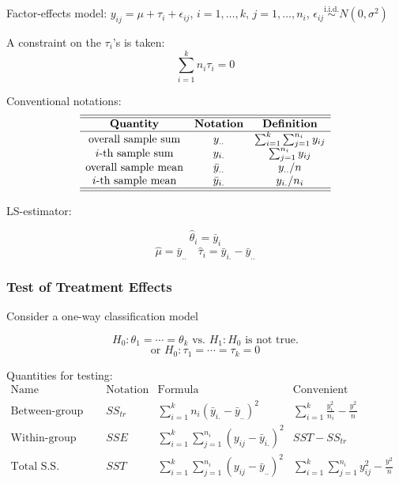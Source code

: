 \documentclass[11pt,a4paper]{article}
\begin{document}
Factor-effects model: $y_{ij} = \mu + \tau_i + \epsilon_{ij}$, $i = 1, \dots, k$, $j = 1, \dots, n_i$, $\epsilon_{ij} \overset{\text{i.i.d.}}{\sim} N(0, \sigma^2)$ \par
A constraint on the $\tau_i$'s is taken:
\[
\sum_{i=1}^{k} n_i \tau_i = 0
\]
 \par

Conventional notations:
\[
\begin{array}{ccc}
    \hline\hline
    \textbf{Quantity} & \textbf{Notation} & \textbf{Definition} \\
    \hline
    \text{overall sample sum} & y_{..} & \sum_{i=1}^{k} \sum_{j=1}^{n_i} y_{ij} \\
    i\text{-th sample sum} & y_{i.} & \sum_{j=1}^{n_i} y_{ij} \\
    \text{overall sample mean} & \bar{y}_{..} & y_{..} / n \\
    i\text{-th sample mean} & \bar{y}_{i.} & y_{i.} / n_i \\
    \hline\hline
\end{array}
\]

LS-estimator: \par
\[
\hat{\theta}_i = \bar{y}_i
\]
\[
\hat{\mu} = \bar{y}_{..} \quad \hat{\tau}_i = \bar{y}_{i.} - \bar{y}_{..}
\]

\subsubsection{Test of Treatment Effects}
Consider a one-way classification model \par
\[
H_0: \theta_1 = \cdots = \theta_k \text{ vs. } H_1: H_0 \text{ is not true.}
\]
\[
\text{or } H_0: \tau_1 = \cdots = \tau_k = 0
\]

Quantities for testing:
\[
\begin{array}{r|c|l|l}
    \hline
    \text{Name} & \text{Notation} & \text{Formula} & \text{Convenient expression} \\
    \hline
    \text{Between-group S.S.} & SS_{tr} & \sum_{i=1}^{k} n_i (\bar{y}_{i.} - \bar{y}_{..})^2 & \sum_{i=1}^{k} \frac{y_{i.}^2}{n_i} - \frac{y_{..}^2}{n} \\
    \text{Within-group S.S.} & SSE & \sum_{i=1}^{k} \sum_{j=1}^{n_i} (y_{ij} - \bar{y}_{i.})^2 & SST - SS_{tr}\\
    \text{Total S.S.} & SST & \sum_{i=1}^{k} \sum_{j=1}^{n_i} (y_{ij} - \bar{y}_{..})^2 & \sum_{i=1}^{k} \sum_{j=1}^{n_i} y_{ij}^2 - \frac{y_{..}^2}{n} \\
\end{array}
\]
\end{document}
